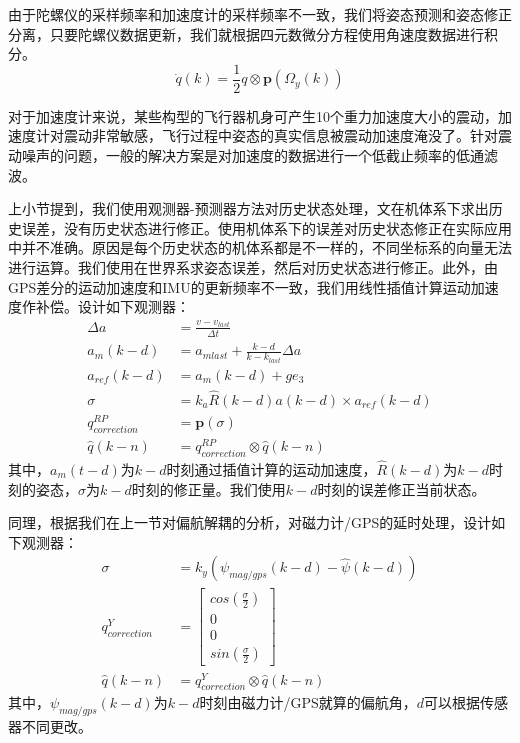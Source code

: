 \documentclass[
  type=master
]{gdutthesis}
\begin{document}
由于陀螺仪的采样频率和加速度计的采样频率不一致，我们将姿态预测和姿态修正分离，只要陀螺仪数据更新，我们就根据四元数微分方程使用角速度数据进行积分。
\begin{equation}\label{eq:quatint}
		\dot{q}(k)=\frac{1}{2} q \otimes \mathbf{p}(\Omega_y(k))
\end{equation}

对于加速度计来说，某些构型的飞行器机身可产生10个重力加速度大小的震动，加速度计对震动非常敏感，飞行过程中姿态的真实信息被震动加速度淹没了。针对震动噪声的问题，一般的解决方案是对加速度的数据进行一个低截止频率的低通滤波。

上小节提到，我们使用观测器-预测器方法对历史状态处理，文\cite{khosravian2014velocity}在机体系下求出历史误差，没有历史状态进行修正。使用机体系下的误差对历史状态修正在实际应用中并不准确。原因是每个历史状态的机体系都是不一样的，不同坐标系的向量无法进行运算。我们使用在世界系求姿态误差，然后对历史状态进行修正。此外，由GPS差分的运动加速度和IMU的更新频率不一致，我们用线性插值计算运动加速度作补偿。设计如下观测器：
\begin{equation}\label{eq:myrpcorrection}
	\begin{aligned}
		\Delta a &= \frac{v - v_{last}}{\Delta t}\\
		a_m (k-d) &= a_{mlast} + \frac{k-d}{k-k_{last}} \Delta a\\
		a_{ref} (k-d) &= a_m (k-d) + g e_3\\
		\sigma &= k_a \hat{R}(k-d) a(k-d) \times a_{ref}(k-d)\\
		q_{correction}^{RP} &= \mathbf{p}(\sigma)\\
		\hat{q}(k-n) &= q_{correction}^{RP} \otimes \hat{q}(k-n)
	\end{aligned}
\end{equation}
其中，$a_m (t-d)$为$k-d$时刻通过插值计算的运动加速度，$\hat{R}(k-d)$为$k-d$时刻的姿态，$\sigma$为$k-d$时刻的修正量。我们使用$k-d$时刻的误差修正当前状态。

同理，根据我们在上一节对偏航解耦的分析，对磁力计/GPS的延时处理，设计如下观测器：
\begin{equation}\label{eq:myyawcorrection}
	\begin{aligned}
		\sigma &= k_y (\psi_{mag/gps}(k-d) - \hat{\psi}(k-d)) \\
		q_{correction}^{Y} &= \begin{bmatrix}
			cos(\frac{\sigma}{2}) \\
			0 \\
			0 \\
			sin(\frac{\sigma}{2})
		\end{bmatrix}\\
		\hat{q}(k-n) &= q_{correction}^{Y} \otimes \hat{q}(k-n)
	\end{aligned}
\end{equation}
其中，$\psi_{mag/gps}(k-d)$为$k-d$时刻由磁力计/GPS就算的偏航角，$d$可以根据传感器不同更改。
\end{document}
